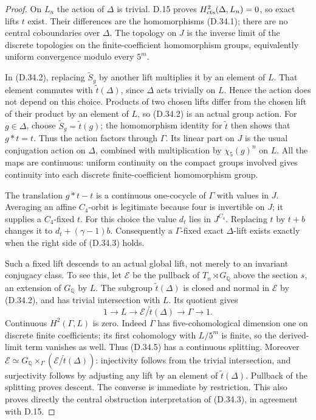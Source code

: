 \begin{proof}
On \(L_n\) the action of \(\Delta\) is trivial.
D.15 proves \(H^2_{\rm cts}(\Delta,L_n)=0\),
so exact lifts \(t\) exist. Their differences
are the homomorphisms (D.34.1); there are no
central coboundaries over \(\Delta\).
The topology on \(J\) is the inverse limit of
the discrete topologies on the finite-coefficient
homomorphism groups, equivalently uniform
convergence modulo every \(5^m\).

In (D.34.2), replacing \(\widetilde S_g\) by
another lift multiplies it by an element of
\(L\). That element commutes with
\(\widetilde t(\Delta)\), since \(\Delta\)
acts trivially on \(L\). Hence the action
does not depend on this choice. Products of
two chosen lifts differ from the chosen lift
of their product by an element of \(L\),
so (D.34.2) is an actual group action.
For \(g\in\Delta\), choose
\(\widetilde S_g=\widetilde t(g)\); the
homomorphism identity for \(\widetilde t\)
then shows that \(g*t=t\).
Thus the action factors through \(\Gamma\).
Its linear part on \(J\) is the usual
conjugation action on \(\Delta\), combined
with multiplication by \(\chi_5(g)^n\)
on \(L\). All the maps are continuous:
uniform continuity on the compact groups
involved gives continuity into each discrete
finite-coefficient homomorphism group.

The translation \(g*t-t\) is a continuous
one-cocycle of \(\Gamma\) with values in
\(J\). Averaging an affine \(C_4\)-orbit is
legitimate because four is invertible on
\(J\); it supplies a \(C_4\)-fixed \(t\).
For this choice the value \(d_t\) lies in
\(J^{C_4}\). Replacing \(t\) by \(t+b\)
changes it to \(d_t+(\gamma-1)b\).
Consequently a \(\Gamma\)-fixed exact
\(\Delta\)-lift exists exactly when the
right side of (D.34.3) holds.

Such a fixed lift descends to an actual
global lift, not merely to an invariant
conjugacy class. To see this, let
\(\mathcal E\) be the pullback of
\(T_n\rtimes G_{\mathbb Q}\) above the
section \(s\), an extension of
\(G_{\mathbb Q}\) by \(L\).
The subgroup \(\widetilde t(\Delta)\) is
closed and normal in \(\mathcal E\) by
(D.34.2), and has trivial intersection
with \(L\). Its quotient gives
\[
 1\longrightarrow L\longrightarrow
 \mathcal E/\widetilde t(\Delta)
       \longrightarrow\Gamma\longrightarrow1.
                                                        \tag{D.34.5}
\]
Continuous \(H^2(\Gamma,L)\) is zero.
Indeed \(\Gamma\) has five-cohomological
dimension one on discrete finite coefficients;
its first cohomology with \(L/5^m\) is finite,
so the derived-limit term vanishes as well.
Thus (D.34.5) has a continuous splitting.
Moreover
\(\mathcal E\simeq
G_{\mathbb Q}\times_\Gamma
(\mathcal E/\widetilde t(\Delta))\):
injectivity follows from the trivial
intersection, and surjectivity follows by
adjusting any lift by an element of
\(\widetilde t(\Delta)\).
Pullback of the splitting proves descent.
The converse is immediate by restriction.
This also proves directly the central
obstruction interpretation of (D.34.3),
in agreement with D.15.


\end{proof}

